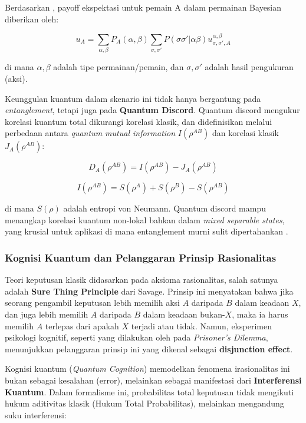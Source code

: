 Berdasarkan \citet{lowe_linking_2024}, payoff ekspektasi untuk pemain A dalam permainan Bayesian diberikan oleh:

\[ u_A = \sum_{\alpha, \beta} P_A(\alpha, \beta) \sum_{\sigma, \sigma'} P(\sigma \sigma' | \alpha \beta) u^{\alpha, \beta}_{\sigma, \sigma', A} \]

di mana $\alpha, \beta$ adalah tipe permainan/pemain, dan $\sigma, \sigma'$ adalah hasil pengukuran (aksi).

Keunggulan kuantum dalam skenario ini tidak hanya bergantung pada \textit{entanglement}, tetapi juga pada \textbf{Quantum Discord}. Quantum discord mengukur korelasi kuantum total dikurangi korelasi klasik, dan didefinisikan melalui perbedaan antara \textit{quantum mutual information} $I(\rho^{AB})$ dan korelasi klasik $J_A(\rho^{AB})$:

\[ D_A(\rho^{AB}) = I(\rho^{AB}) - J_A(\rho^{AB}) \]

\[ I(\rho^{AB}) = S(\rho^A) + S(\rho^B) - S(\rho^{AB}) \]

di mana $S(\rho)$ adalah entropi von Neumann. Quantum discord mampu menangkap korelasi kuantum non-lokal bahkan dalam \textit{mixed separable states}, yang krusial untuk aplikasi di mana entanglement murni sulit dipertahankan \citep{lowe_linking_2024}.

\subsubsection{Kognisi Kuantum dan Pelanggaran Prinsip Rasionalitas}

Teori keputusan klasik didasarkan pada aksioma rasionalitas, salah satunya adalah \textbf{Sure Thing Principle} dari Savage. Prinsip ini menyatakan bahwa jika seorang pengambil keputusan lebih memilih aksi $A$ daripada $B$ dalam keadaan $X$, dan juga lebih memilih $A$ daripada $B$ dalam keadaan bukan-$X$, maka ia harus memilih $A$ terlepas dari apakah $X$ terjadi atau tidak. Namun, eksperimen psikologi kognitif, seperti yang dilakukan oleh \citet{tversky_disjunction_1992} pada \textit{Prisoner's Dilemma}, menunjukkan pelanggaran prinsip ini yang dikenal sebagai \textbf{disjunction effect}.

Kognisi kuantum (\textit{Quantum Cognition}) memodelkan fenomena irasionalitas ini bukan sebagai kesalahan (error), melainkan sebagai manifestasi dari \textbf{Interferensi Kuantum}. Dalam formalisme ini, probabilitas total keputusan tidak mengikuti hukum aditivitas klasik (Hukum Total Probabilitas), melainkan mengandung suku interferensi:

